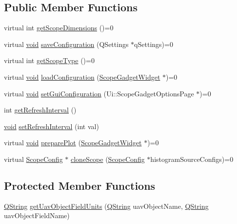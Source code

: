 \subsection*{\-Public \-Member \-Functions}
\begin{DoxyCompactItemize}
\item 
virtual int \hyperlink{group___scope_plugin_ga4eaff3a14398928e3ffba453ea199699}{get\-Scope\-Dimensions} ()=0
\item 
virtual \hyperlink{group___u_a_v_objects_plugin_ga444cf2ff3f0ecbe028adce838d373f5c}{void} \hyperlink{group___scope_plugin_gac41e7079a53acbf5fc4c32b59c120da2}{save\-Configuration} (\-Q\-Settings $\ast$q\-Settings)=0
\item 
virtual int \hyperlink{group___scope_plugin_gafdf4c997ec7b0c40644711b3578db610}{get\-Scope\-Type} ()=0
\item 
virtual \hyperlink{group___u_a_v_objects_plugin_ga444cf2ff3f0ecbe028adce838d373f5c}{void} \hyperlink{group___scope_plugin_gaea33bfb89c03afcf1f81969983ed926c}{load\-Configuration} (\hyperlink{class_scope_gadget_widget}{\-Scope\-Gadget\-Widget} $\ast$)=0
\item 
virtual \hyperlink{group___u_a_v_objects_plugin_ga444cf2ff3f0ecbe028adce838d373f5c}{void} \hyperlink{group___scope_plugin_ga322c46b28e707e71d7076f0e51cdc0b4}{set\-Gui\-Configuration} (\-Ui\-::\-Scope\-Gadget\-Options\-Page $\ast$)=0
\item 
int \hyperlink{group___scope_plugin_ga6886a1b5239454cd6525352914381382}{get\-Refresh\-Interval} ()
\item 
\hyperlink{group___u_a_v_objects_plugin_ga444cf2ff3f0ecbe028adce838d373f5c}{void} \hyperlink{group___scope_plugin_ga9d0e03a1430ff0f766ff51a3daafb2ee}{set\-Refresh\-Interval} (int val)
\item 
virtual \hyperlink{group___u_a_v_objects_plugin_ga444cf2ff3f0ecbe028adce838d373f5c}{void} \hyperlink{group___scope_plugin_gaacd609b338179da5902c1a644a4d9676}{prepare\-Plot} (\hyperlink{class_scope_gadget_widget}{\-Scope\-Gadget\-Widget} $\ast$)=0
\item 
virtual \hyperlink{class_scope_config}{\-Scope\-Config} $\ast$ \hyperlink{group___scope_plugin_ga550248228c701bfd0a35edf08ec94b1a}{clone\-Scope} (\hyperlink{class_scope_config}{\-Scope\-Config} $\ast$histogram\-Source\-Configs)=0
\end{DoxyCompactItemize}
\subsection*{\-Protected \-Member \-Functions}
\begin{DoxyCompactItemize}
\item 
\hyperlink{group___u_a_v_objects_plugin_gab9d252f49c333c94a72f97ce3105a32d}{\-Q\-String} \hyperlink{group___scope_plugin_gac9be5bd5f2a8394d4d2de1e8b6e9e382}{get\-Uav\-Object\-Field\-Units} (\hyperlink{group___u_a_v_objects_plugin_gab9d252f49c333c94a72f97ce3105a32d}{\-Q\-String} uav\-Object\-Name, \hyperlink{group___u_a_v_objects_plugin_gab9d252f49c333c94a72f97ce3105a32d}{\-Q\-String} uav\-Object\-Field\-Name)
\end{DoxyCompactItemize}
